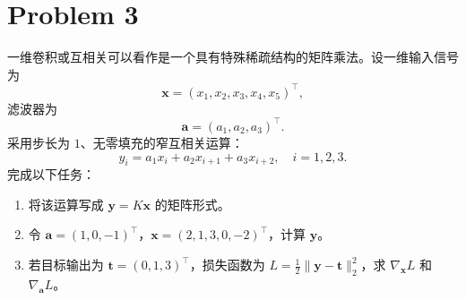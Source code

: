 \section*{Problem 3}

一维卷积或互相关可以看作是一个具有特殊稀疏结构的矩阵乘法。设一维输入信号为
\[
\bm{x} = (x_1, x_2, x_3, x_4, x_5)^\top,
\]
滤波器为
\[
\bm{a} = (a_1, a_2, a_3)^\top.
\]
采用步长为 $1$、无零填充的窄互相关运算：
\[
y_i = a_1 x_i + a_2 x_{i+1} + a_3 x_{i+2},\quad i = 1, 2, 3.
\]
完成以下任务：
\begin{enumerate}
    \item 将该运算写成 $\bm{y} = K \bm{x}$ 的矩阵形式。
    \item 令 $\bm{a} = (1, 0, -1)^\top$，$\bm{x} = (2, 1, 3, 0, -2)^\top$，计算 $\bm{y}$。
    \item 若目标输出为 $\bm{t} = (0, 1, 3)^\top$，损失函数为 $L = \frac{1}{2} \|\bm{y} - \bm{t}\|_2^2$，求 $\nabla_{\bm{x}} L$ 和 $\nabla_{\bm{a}} L$。
\end{enumerate}
